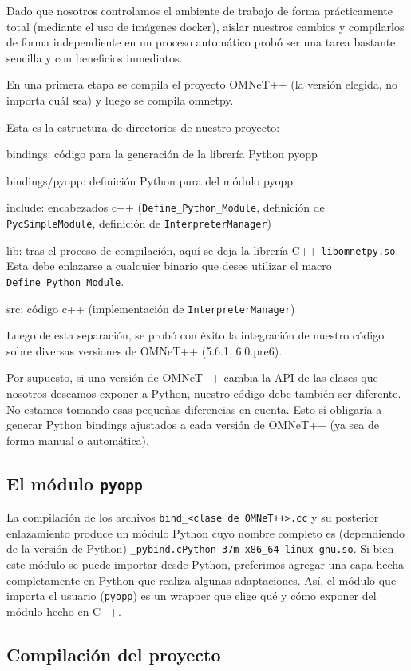 \documentclass[]{article}
\begin{document}
Dado que nosotros controlamos el ambiente de trabajo de forma prácticamente
total (mediante el uso de imágenes docker), aislar nuestros cambios y
compilarlos de forma independiente en un proceso automático probó ser una tarea
bastante sencilla y con beneficios inmediatos.

En una primera etapa se compila el proyecto OMNeT++ (la versión elegida, no
importa cuál sea) y luego se compila omnetpy.

Esta es la estructura de directorios de nuestro proyecto:

bindings: código para la generación de la librería Python pyopp

bindings/pyopp: definición Python pura del módulo pyopp

include: encabezados c++ (\verb!Define_Python_Module!, definición de
\verb!PycSimpleModule!, definición de \verb!InterpreterManager!)

lib: tras el proceso de compilación, aquí se deja la librería C++
\verb!libomnetpy.so!. Esta debe enlazarse a cualquier binario que desee
utilizar el macro \verb!Define_Python_Module!.

src: código c++ (implementación de \verb!InterpreterManager!)

Luego de esta separación, se probó con éxito la integración de nuestro código
sobre diversas versiones de OMNeT++ (5.6.1, 6.0.pre6).

Por supuesto, si una versión de OMNeT++ cambia la API de las clases que
nosotros deseamos exponer a Python, nuestro código debe también ser diferente.
No estamos tomando esas pequeñas diferencias en cuenta. Esto sí obligaría a
generar Python bindings ajustados a cada versión de OMNeT++ (ya sea de forma
manual o automática).

\subsection{El módulo \texttt{pyopp}}

La compilación de los archivos \verb!bind_<clase de OMNeT++>.cc! y su posterior
enlazamiento produce un módulo Python cuyo nombre completo es (dependiendo de
la versión de Python) \verb!_pybind.cPython-37m-x86_64-linux-gnu.so!. Si bien
este módulo se puede importar desde Python, preferimos agregar una capa hecha
completamente en Python que realiza algunas adaptaciones. Así, el módulo que
importa el usuario (\verb!pyopp!) es un wrapper que elige qué y cómo exponer
del módulo hecho en C++.

\subsection{Compilación del proyecto}
\end{document}

